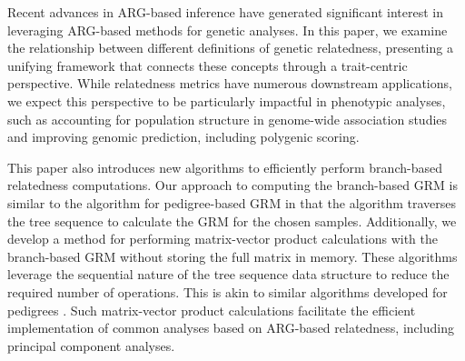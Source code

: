 

Recent advances in ARG-based inference have generated significant interest in leveraging ARG-based methods for genetic analyses. In this paper, we examine the relationship between different definitions of genetic relatedness, presenting a unifying framework that connects these concepts through a trait-centric perspective. While relatedness metrics have numerous downstream applications, we expect this perspective to be particularly impactful in phenotypic analyses, such as accounting for population structure in genome-wide association studies and improving genomic prediction, including polygenic scoring.






This paper also introduces new algorithms to efficiently perform branch-based relatedness computations. Our approach to computing the branch-based GRM is similar to the algorithm for pedigree-based GRM \citep{emik1949systematic, cruden1949computation, henderson1976simple} in that the algorithm traverses the tree sequence to calculate the GRM for the chosen samples. Additionally, we develop a method for performing matrix-vector product calculations with the branch-based GRM without storing the full matrix in memory.  These algorithms leverage the sequential nature of the tree sequence data structure to reduce the required number of operations.  This is akin to similar algorithms developed for pedigrees \citep{colleau2002indirect}. Such matrix-vector product calculations facilitate the efficient implementation of common analyses based on ARG-based relatedness, including principal component analyses.

